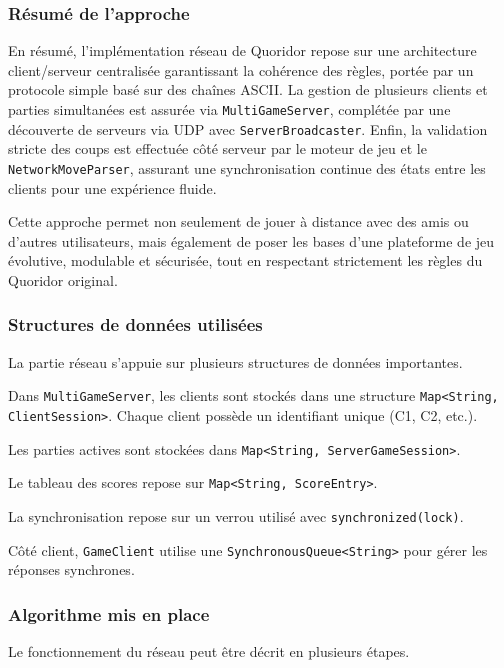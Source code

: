\documentclass[a4paper]{article}
\begin{document}
\subsubsection{Résumé de l’approche}



En résumé, l’implémentation réseau de Quoridor repose sur une architecture client/serveur centralisée garantissant la cohérence des règles, portée par un protocole simple basé sur des chaînes ASCII. La gestion de plusieurs clients et parties simultanées est assurée via \texttt{MultiGameServer}, complétée par une découverte de serveurs via UDP avec \texttt{ServerBroadcaster}. Enfin, la validation stricte des coups est effectuée côté serveur par le moteur de jeu et le \texttt{NetworkMoveParser}, assurant une synchronisation continue des états entre les clients pour une expérience fluide.


Cette approche permet non seulement de jouer à distance avec des amis ou d’autres utilisateurs, mais également de poser les bases d’une plateforme de jeu évolutive, modulable et sécurisée, tout en respectant strictement les règles du Quoridor original.


\subsubsection{Structures de données utilisées}
La partie réseau s’appuie sur plusieurs structures de données importantes.

Dans \texttt{MultiGameServer}, les clients sont stockés dans une structure \texttt{Map<String, ClientSession>}. Chaque client possède un identifiant unique (C1, C2, etc.).

Les parties actives sont stockées dans \texttt{Map<String, ServerGameSession>}.

Le tableau des scores repose sur \texttt{Map<String, ScoreEntry>}.

La synchronisation repose sur un verrou utilisé avec \texttt{synchronized(lock)}.

Côté client, \texttt{GameClient} utilise une \texttt{SynchronousQueue<String>} pour gérer les réponses synchrones.

\subsubsection{Algorithme mis en place}

Le fonctionnement du réseau peut être décrit en plusieurs étapes.
\end{document}
